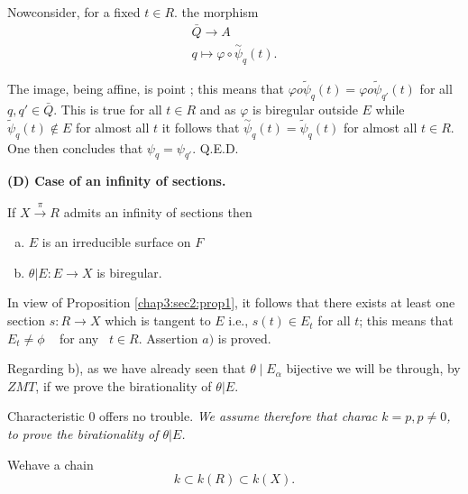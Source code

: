 Now\pageoriginale consider, for a fixed $t\in R$. the morphism
\begin{gather*}
  \bar{Q} \longrightarrow A \\
  q  \longmapsto \varphi \circ \overset{\sim}\psi_q (t).
\end{gather*}

The image, being affine, is point ; this means that $\varphi o 
\tilde{\psi}_q(t)=\varphi o \tilde{\psi}_{q'}(t)$ for all
$q, q'\in \bar{Q}$. This is true for all $t \in R $ and as $\varphi$
is biregular outside $E$ while $ \tilde{\psi}_q (t)  \notin E $
for almost all $t$ it follows that $\overset{\sim}\psi_q
(t)=\tilde{\psi}_q (t)$ for almost all $t \in R$. One then
concludes that $\psi_q=\psi_{q'}$. \hfill Q.E.D.

\medskip
\noindent
\textbf{(D) Case of an infinity of sections.}

\begin{proposition}\label{chap3:sec2:prop2}%
  If $X \overset{\pi} \rightarrow R$ admits an infinity of sections then 
  \begin{enumerate}[a)]
  \item  $E$ is an irreducible surface on $F$
  \item  $ \theta | E : E \rightarrow  X $ is biregular.
  \end{enumerate}
  In view of Proposition \ref{chap3:sec2:prop1}, it follows that there exists at least
  one section $s: R \rightarrow X$ which is tangent to $E$ i.e., $s(t)
  \in E_t $ for  all $t$; this means that $ E_t \neq \phi$ ~ for
  any~ $t \in R$. Assertion $a)$ is  proved. 
\end{proposition}

Regarding b), as we have already seen that $  \theta \mid E_\alpha$
bijective we will be through, by $ZMT$, if we prove the birationality
of $\theta | E$. 

Characteristic $0$ offers no trouble. \textit{We assume therefore that
  charac $ k=p,p\neq 0$, to prove the birationality of $\theta | E$.} 

We\pageoriginale have a chain
$$
k \subset k(R) \subset k (X).
$$

